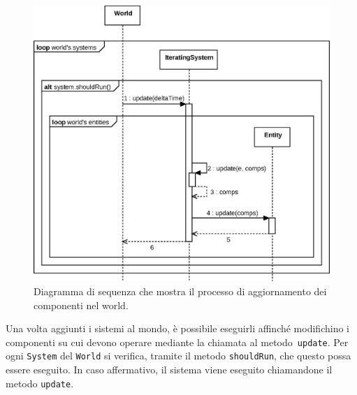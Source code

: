 \begin{figure}[H]
    \centering
    \includegraphics[width=\textwidth]{./img/Sequence}
    \caption{Diagramma di sequenza che mostra il processo di aggiornamento dei componenti nel world.}\label{fig:sequence}
\end{figure}

Una volta aggiunti i sistemi al mondo, è possibile eseguirli affinché modifichino i componenti
su cui devono operare mediante la chiamata al metodo~\texttt{update}.
Per ogni \texttt{System} del \texttt{World} si verifica, tramite il metodo \texttt{shouldRun}, che questo possa essere
eseguito.
In caso affermativo, il sistema viene eseguito chiamandone il metodo \texttt{update}.
